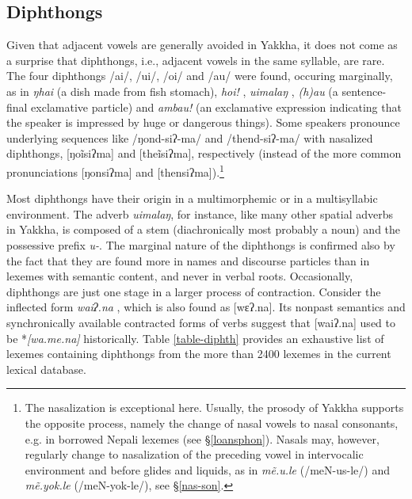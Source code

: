 \subsection{Diphthongs}\label{diphth}

Given that adjacent vowels are generally avoided in Yakkha, it does not come as a surprise that diphthongs, i.e., adjacent vowels in the same syllable, are rare. The four diphthongs /ai/, /ui/, /oi/ and /au/ were found, occuring marginally, as in \emph{ŋhai} (a dish made from fish stomach), \emph{hoi!} ,  \emph{uimalaŋ} , \emph{(h)au} (a sentence-final exclamative particle) and \emph{ambau!} (an exclamative  expression indicating that the speaker is impressed by huge or dangerous things). Some speakers pronounce underlying sequences like /ŋond-siʔ-ma/ and /thend-siʔ-ma/ with nasalized diphthongs, [ŋoĩsiʔma] and [theĩsiʔma], respectively (instead of the more common pronunciations [ŋonsiʔma] and [thensiʔma]).\footnote{The nasalization is exceptional here. Usually, the prosody of Yakkha supports the opposite process, namely the change of nasal vowels to nasal consonants, e.g. in borrowed Nepali lexemes (see §\ref{loansphon}). Nasals may, however, regularly change to nasalization of the preceding vowel in intervocalic environment and before glides and liquids, as in \emph{mẽ.u.le}  (/meN-us-le/) and \emph{mẽ.yok.le}  (/meN-yok-le/), see §\ref{nas-son}.} 

Most diphthongs have their origin in a multimorphemic or in a multisyllabic environment. The adverb \emph{uimalaŋ}, for instance, like many other spatial adverbs in Yakkha, is composed of a stem (diachronically most probably a noun) and the possessive prefix \emph{u-}. The marginal nature of the diphthongs is confirmed also by the fact  that they are found more in names and discourse particles than in lexemes with semantic content, and never in verbal roots. Occasionally, diphthongs are just one stage in a larger process of contraction. Consider the inflected form \emph{waiʔ.na} , which is also found as [wɛʔ.na]. Its nonpast semantics and synchronically available contracted forms of verbs suggest that [waiʔ.na]  used to be *\emph{[wa.me.na] } historically. Table \ref{table-diphth} provides an exhaustive list of lexemes containing diphthongs from the more than 2400 lexemes in the current lexical database.



